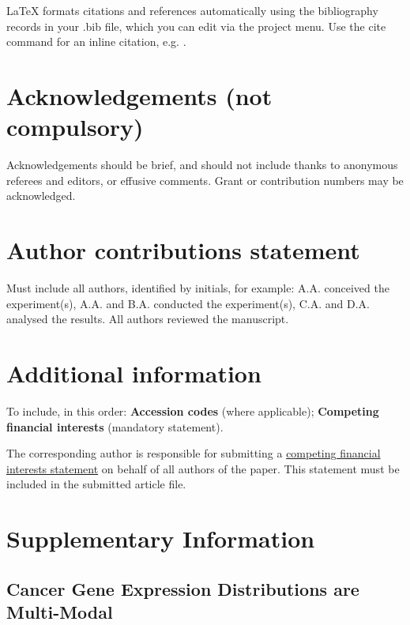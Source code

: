 \documentclass[fleqn,10pt]{wlscirep}
\newcommand{\beginsupplement}{%
        \setcounter{table}{0}
        \renewcommand{\thetable}{S\arabic{table}}%
        \setcounter{figure}{0}
        \renewcommand{\thefigure}{S\arabic{figure}}%
     }
\begin{document}


\noindent LaTeX formats citations and references automatically using the bibliography records in your .bib file, which you can edit via the project menu. Use the cite command for an inline citation, e.g.  \cite{Figueredo:2009dg}.

\section*{Acknowledgements (not compulsory)}

Acknowledgements should be brief, and should not include thanks to anonymous referees and editors, or effusive comments. Grant or contribution numbers may be acknowledged.

\section*{Author contributions statement}

Must include all authors, identified by initials, for example:
A.A. conceived the experiment(s),  A.A. and B.A. conducted the experiment(s), C.A. and D.A. analysed the results.  All authors reviewed the manuscript. 

\section*{Additional information}

To include, in this order: \textbf{Accession codes} (where applicable); \textbf{Competing financial interests} (mandatory statement). 

The corresponding author is responsible for submitting a \href{http://www.nature.com/srep/policies/index.html#competing}{competing financial interests statement} on behalf of all authors of the paper. This statement must be included in the submitted article file.

\beginsupplement
\section*{Supplementary Information}

\subsection*{Cancer Gene Expression Distributions are Multi-Modal}
\end{document}
